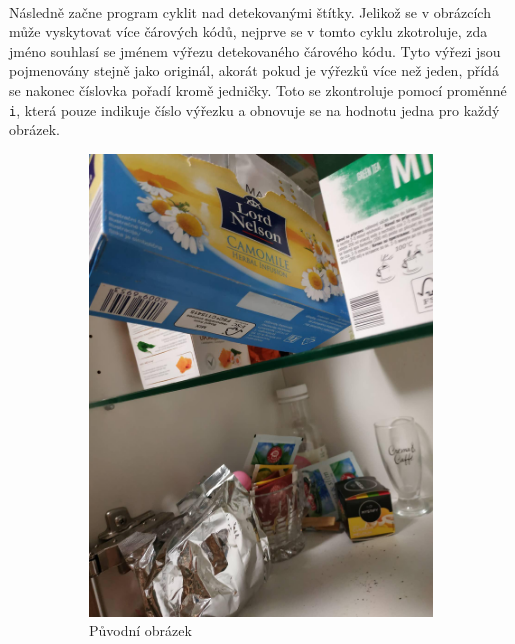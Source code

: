 \paragraph{} Následně začne program cyklit nad detekovanými štítky. Jelikož se v obrázcích může vyskytovat více čárových kódů, nejprve se v tomto cyklu zkotroluje, zda jméno souhlasí se jménem výřezu detekovaného čárového kódu. Tyto výřezi jsou pojmenovány stejně jako originál, akorát pokud je výřezků více než jeden, přídá se nakonec číslovka pořadí kromě jedničky. Toto se zkontroluje pomocí proměnné \texttt{i}, která pouze indikuje číslo výřezku a obnovuje se na hodnotu jedna pro každý obrázek.
\begin{figure}[htbp]
    \centering
    \begin{subfigure}{0.7\textwidth}
    \centering
    \includegraphics[width=0.41\linewidth]{obrazky-figures/merge_implement.jpg}\hfill
    \caption{Původní obrázek}
    \end{subfigure}
    \begin{subfigure}{0.6\textwidth}
    \hfill

\end{subfigure}
\end{figure}
